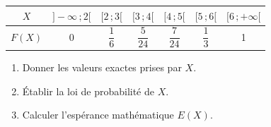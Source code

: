 \documentclass[11pt]{article}
\begin{document}
\begin{center}
\renewcommand{\arraystretch}{1.8}
\begin{tabular}{|c|c|c|c|c|c|c|}
\hline
$X$ & $]-\infty\,;2[$ & $[2\,;3[$ & $[3\,;4[$ & $[4\,;5[$ & $[5\,;6[$ & $[6\,;+\infty[$ \\
\hline
$F(X)$ & 0 & $\dfrac{1}{6}$ & $\dfrac{5}{24}$ & $\dfrac{7}{24}$ & $\dfrac{1}{3}$ & 1 \\
\hline
\end{tabular}
\end{center}

\begin{enumerate}
  \item Donner les valeurs exactes prises par $X$.
  \item Établir la loi de probabilité de $X$.
  \item Calculer l'espérance mathématique $E(X)$.
\end{enumerate}
\end{document}
